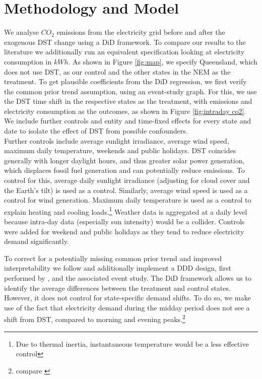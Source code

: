 \section{Methodology and Model}

We analyse $CO_2$ emissions from the electricity grid before and after the exogenous \ac{DST} change using a \acf{DiD} framework. To compare our results to the literature we additionally run an equivalent specification looking at electricity consumption in $kWh$. As shown in Figure \ref{fig:map}, we specify Queensland, which does not use \ac{DST}, as our control and the other states in the \ac{NEM} as the treatment. To get plausible coefficients from the \ac{DiD} regression, we first verify the common prior trend assumption, using an event-study graph.
For this, we use the \ac{DST} time shift in the respective states as the treatment, with emissions and electricity consumption as the outcomes, as shown in Figure \ref{fig:intraday co2}. We include further controls and entity and time-fixed effects for every state and date to isolate the effect of \ac{DST} from possible confounders. \\ 
Further controls include average sunlight irradiance, average wind speed, maximum daily temperature, weekends and public holidays. \ac{DST} coincides generally with longer daylight hours, and thus greater solar power generation, which displaces fossil fuel generation and can potentially reduce emissions. To control for this, average daily sunlight irradiance (adjusting for cloud cover and the Earth's tilt) is used as a control. Similarly, average wind speed is used as a control for wind generation. Maximum daily temperature is used as a control to explain heating and cooling loads.\footnote{Due to thermal inertia, instantaneous temperature would be a less effective control} Weather data is aggregated at a daily level because intra-day data (especially sun intensity) would be a collider. %
Controls were added for weekend and public holidays as they tend to reduce electricity demand significantly.

To correct for a potentially missing common prior trend and improved interpretability we follow \textcite{kellogg_daylight_2008} and additionally implement a \ac{DDD} design, first performed by \textcite{gruber_incidence_1994}, and the associated event study. The \ac{DiD} framework allows us to identify the average differences between the treatment and control states. However, it does not control for state-specific demand shifts. To do so, we make use of the fact that electricity demand during the midday period does not see a shift from DST, compared to morning and evening peaks.\footnote{compare \textcite{kellogg_daylight_2008}}


